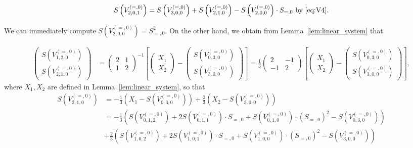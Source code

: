 \documentclass[12pt]{amsart}
\theoremstyle{plain}
\theoremstyle{remark}
\begin{document}
\begin{align*}
S\left( V_{2,0,1}^{(=,0)} \right) &= S\left( V_{3,0,0}^{(=,0)} \right) + S\left( V_{2,1,0}^{(=,0)} \right) - S\left( V_{2,0,0}^{(=,0)} \right) \cdot S_{=,0} \text{ by } \eqref{eq:V4}.\\
\end{align*}

We can immediately compute $S\left( V_{2,0,0}^{(=,0)} \right) = S_{=,0}^2$. On the other hand, we obtain from Lemma~\ref{lem:linear_system} that

\begin{align*}
\begin{pmatrix}
S(V_{1,2,0}^{(=,0)}) \\
S(V_{2,1,0}^{(=,0)})
\end{pmatrix}
&= \begin{pmatrix}
2 & 1 \\ 1 & 2
\end{pmatrix}^{-1}
\left[ \begin{pmatrix}
X_1 \\ X_2
\end{pmatrix} - \begin{pmatrix}
S(V_{0,3,0}^{(=,0)}) \\ S(V_{3,0,0}^{(=,0)})
\end{pmatrix} \right]= \frac{1}{3} \begin{pmatrix}
2 & -1 \\ -1 & 2
\end{pmatrix} \left[ \begin{pmatrix}
X_1 \\ X_2
\end{pmatrix} - \begin{pmatrix}
S(V_{0,3,0}^{(=,0)}) \\ S(V_{3,0,0}^{(=,0)})
\end{pmatrix} \right],
\end{align*}
where $X_1,X_2$ are defined in Lemma~\ref{lem:linear_system}, so that
\begin{align*}
S\left( V_{2,1,0}^{(=,0)} \right) &=  -\frac{1}{3}\left( X_1 -S\left( V_{0,3,0}^{(=,0)} \right) \right) + \frac{2}{3} \left( X_2 -S\left( V_{3,0,0}^{(=,0)} \right) \right)\\ 
&= -\frac{1}{3} \left( S\left( V_{0,1,2}^{(=,0)} \right) + 2 S\left( V_{0,1,1}^{(=,0)} \right) \cdot S_{=,0} + S\left( V_{0,1,0}^{(=,0)} \right) \cdot (S_{=,0})^2 -S\left( V_{0,3,0}^{(=,0)} \right) \right) \\
&+ \frac{2}{3} \left( S\left( V_{1,0,2}^{(=,0)} \right) + 2 S\left( V_{1,0,1}^{(=,0)} \right) \cdot S_{=,0} + S\left( V_{1,0,0}^{(=,0)} \right) \cdot (S_{=,0})^2 -S\left( V_{3,0,0}^{(=,0)} \right) \right)
\end{align*}\smallskip
 
\end{document}
